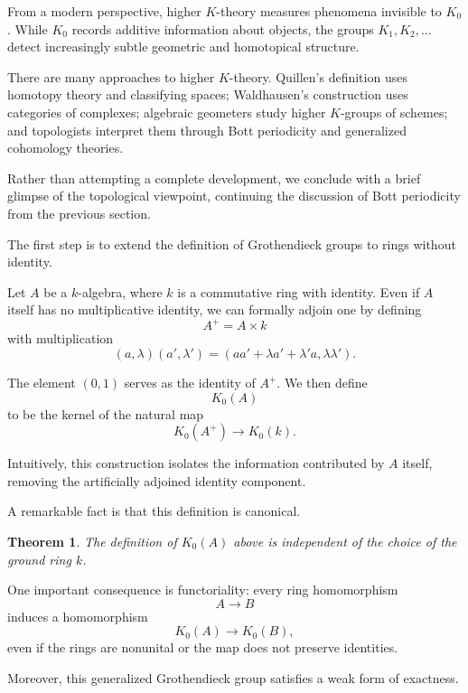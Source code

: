 \documentclass[12pt,reqno]{amsart}
\theoremstyle{plain}
\numberwithin{equation}{section}
\newtheorem{theorem}{Theorem}[section]
\begin{document}
From a modern perspective, higher $K$-theory measures phenomena invisible to $K_0$. While $K_0$ records additive information about objects, the groups $K_1,K_2,\dots$ detect increasingly subtle geometric and homotopical structure.

There are many approaches to higher $K$-theory. Quillen's definition uses homotopy theory and classifying spaces; Waldhausen's construction uses categories of complexes; algebraic geometers study higher $K$-groups of schemes; and topologists interpret them through Bott periodicity and generalized cohomology theories. 

Rather than attempting a complete development, we conclude with a brief glimpse of the topological viewpoint, continuing the discussion of Bott periodicity from the previous section.


The first step is to extend the definition of Grothendieck groups to rings without identity.

Let $A$ be a $k$-algebra, where $k$ is a commutative ring with identity. Even if $A$ itself has no multiplicative identity, we can formally adjoin one by defining
\[
A^+=A\times k
\]
with multiplication
\[
(a,\lambda)(a',\lambda')
=
(aa'+\lambda a'+\lambda' a,\lambda\lambda').
\]

The element $(0,1)$ serves as the identity of $A^+$.
We then define
\[
K_0(A)
\]
to be the kernel of the natural map
\[
K_0(A^+)\to K_0(k).
\]

Intuitively, this construction isolates the information contributed by $A$ itself, removing the artificially adjoined identity component.

A remarkable fact is that this definition is canonical.

\begin{theorem}
The definition of $K_0(A)$ above is independent of the choice of the ground ring $k$.
\end{theorem}

One important consequence is functoriality: every ring homomorphism
\[
A\to B
\]
induces a homomorphism
\[
K_0(A)\to K_0(B),
\]
even if the rings are nonunital or the map does not preserve identities.

Moreover, this generalized Grothendieck group satisfies a weak form of exactness.
\end{document}

